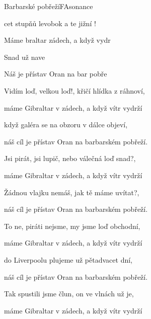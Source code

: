 \begin{song}{Barbarské pobřeží}{F}{Asonance}

\begin{SBVerse}

cet stupňů levobok a te jižní !

Máme braltar  zádech, a když  vydr

Snad   už  nave

Náš  je přístav Oran na bar pobře

\end{SBVerse}

\begin{SBVerse}

Vidím loď, velkou loď!, křičí hlídka z ráhnoví,

máme Gibraltar v zádech, a když vítr vydrží

když galéra se na obzoru v dálce objeví,

náš cíl je přístav Oran na barbarském pobřeží.

\end{SBVerse}

\begin{SBVerse}

Jsi pirát, jsi lupič, nebo válečná loď snad?,

máme Gibraltar v zádech, a když vítr vydrží

Žádnou vlajku nemáš, jak tě máme uvítat?,

náš cíl je přístav Oran na barbarském pobřeží.

\end{SBVerse}

\begin{SBVerse}

To ne, piráti nejsme, my jsme loď obchodní,

máme Gibraltar v zádech, a když vítr vydrží

do Liverpoolu plujeme už pětadvacet dní,

náš cíl je přístav Oran na barbarském pobřeží.

\end{SBVerse}

\begin{SBVerse}

Tak spustili jsme člun, on ve vlnách už je,

máme Gibraltar v zádech, a když vítr vydrží


\end{SBVerse}
\end{song}
